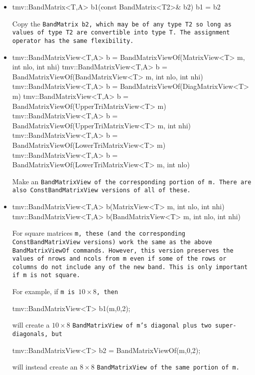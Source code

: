 \begin{itemize}
\item
\begin{tmvcode}
tmv::BandMatrix<T,A> b1(const BandMatrix<T2>& b2)
b1 = b2
\end{tmvcode}
Copy the \tt{BandMatrix b2}, which may be of any type \tt{T2} so long
as values of type \tt{T2} are convertible into type \tt{T}.
The assignment operator has the same flexibility.

\item
\begin{tmvcode}
tmv::BandMatrixView<T,A> b = 
      BandMatrixViewOf(MatrixView<T> m, int nlo, int nhi)
tmv::BandMatrixView<T,A> b = 
      BandMatrixViewOf(BandMatrixView<T> m, int nlo, int nhi)
tmv::BandMatrixView<T,A> b = 
      BandMatrixViewOf(DiagMatrixView<T> m)
tmv::BandMatrixView<T,A> b = 
      BandMatrixViewOf(UpperTriMatrixView<T> m)
tmv::BandMatrixView<T,A> b = 
      BandMatrixViewOf(UpperTriMatrixView<T> m, int nhi)
tmv::BandMatrixView<T,A> b = 
      BandMatrixViewOf(LowerTriMatrixView<T> m)
tmv::BandMatrixView<T,A> b = 
      BandMatrixViewOf(LowerTriMatrixView<T> m, int nlo)
\end{tmvcode}
Make an \tt{BandMatrixView} of the corresponding portion of \tt{m}.  
There are also \tt{ConstBandMatrixView} versions of all of these.  

\item
\begin{tmvcode}
tmv::BandMatrixView<T,A> b(MatrixView<T> m, int nlo, int nhi)
tmv::BandMatrixView<T,A> b(BandMatrixView<T> m, int nlo, int nhi)
\end{tmvcode}
For square matrices \tt{m}, these (and the corresponding \tt{ConstBandMatrixView}
versions) work the same as the above \tt{BandMatrixViewOf}
commands.  However, this version preserves the values of \tt{nrows} and \tt{ncols}
from \tt{m}
even if some of the rows or columns do not include any of the new band.
This is only important if \tt{m} is not square.

For example, if \tt{m} is $10 \times 8$, then 
\begin{tmvcode}
tmv::BandMatrixView<T> b1(m,0,2);
\end{tmvcode}
will create a $10 \times 8$ \tt{BandMatrixView} of \tt{m}'s diagonal plus two super-diagonals, but
\begin{tmvcode}
tmv::BandMatrixView<T> b2 = BandMatrixViewOf(m,0,2);
\end{tmvcode}
will instead create an $8 \times 8$ \tt{BandMatrixView} of the same portion of \tt{m}.


\end{itemize}
